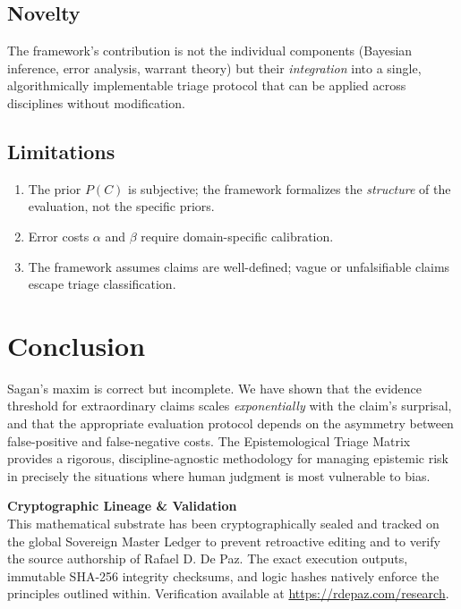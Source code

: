 \documentclass[12pt, a4paper]{article}
\theoremstyle{plain}
\theoremstyle{definition}
\begin{document}
\subsection{Novelty}

The framework's contribution is not the individual components (Bayesian
inference, error analysis, warrant theory) but their \emph{integration}
into a single, algorithmically implementable triage protocol that can
be applied across disciplines without modification.

\subsection{Limitations}
\begin{enumerate}
  \item The prior $P(C)$ is subjective; the framework formalizes the
    \emph{structure} of the evaluation, not the specific priors.
  \item Error costs $\alpha$ and $\beta$ require domain-specific
    calibration.
  \item The framework assumes claims are well-defined; vague or
    unfalsifiable claims escape triage classification.
\end{enumerate}

\section{Conclusion}\label{sec:conclusion}

Sagan's maxim is correct but incomplete. We have shown that the
evidence threshold for extraordinary claims scales \emph{exponentially}
with the claim's surprisal, and that the appropriate evaluation
protocol depends on the asymmetry between false-positive and
false-negative costs. The Epistemological Triage Matrix provides a
rigorous, discipline-agnostic methodology for managing epistemic risk
in precisely the situations where human judgment is most vulnerable
to bias.


\vspace{2em}
\noindent\hrulefill
\vspace{1em}







\vspace{3em}
\noindent\hrulefill
\vspace{1em}

\noindent\textbf{Cryptographic Lineage \& Validation}\\
This mathematical substrate has been cryptographically sealed and tracked on the global Sovereign Master Ledger to prevent retroactive editing and to verify the source authorship of Rafael D. De Paz. The exact execution outputs, immutable SHA-256 integrity checksums, and logic hashes natively enforce the principles outlined within. Verification available at \url{https://rdepaz.com/research}.
\end{document}
